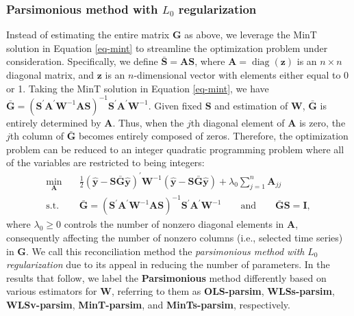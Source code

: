 \documentclass[
  11pt]{article}
\theoremstyle{plain}
\theoremstyle{remark}
\begin{document}
\subsubsection*{\texorpdfstring{Parsimonious method with \(L_0\)
regularization}{Parsimonious method with L\_0 regularization}}\label{parsimonious-method-with-l_0-regularization}

Instead of estimating the entire matrix \(\bm{G}\) as above, we leverage
the MinT solution in Equation \eqref{eq-mint} to streamline the
optimization problem under consideration. Specifically, we define
\(\bar{\bm{S}} = \bm{A}\bm{S}\), where
\(\bm{A} = \operatorname{diag}(\bm{z})\) is an \(n \times n\) diagonal
matrix, and \(\bm{z}\) is an \(n\)-dimensional vector with elements
either equal to 0 or 1. Taking the MinT solution in Equation
\eqref{eq-mint}, we have
\(\bar{\bm{G}} = (\bm{S}^{\prime}\bm{A}^{\prime}\bm{W}^{-1}\bm{A}\bm{S})^{-1}\bm{S}^{\prime}\bm{A}^{\prime}\bm{W}^{-1}\).
Given fixed \(\bm{S}\) and estimation of \(\bm{W}\), \(\bar{\bm{G}}\) is
entirely determined by \(\bm{A}\). Thus, when the \(j\)th diagonal
element of \(\bm{A}\) is zero, the \(j\)th column of \(\bar{\bm{G}}\)
becomes entirely composed of zeros. Therefore, the optimization problem
can be reduced to an integer quadratic programming problem where all of
the variables are restricted to being integers: \begin{align*}
\min_{\bm{A}} \quad & \frac{1}{2}\left(\hat{\bm{y}}-\bm{S}\bar{\bm{G}}\hat{\bm{y}}\right)^{\prime} \bm{W}^{-1}\left(\hat{\bm{y}}-\bm{S}\bar{\bm{G}}\hat{\bm{y}}\right) + \lambda_0 \sum_{j=1}^n \bm{A}_{jj} \\
\text{s.t.} \quad & \bar{\bm{G}} = (\bm{S}^{\prime}\bm{A}^{\prime}\bm{W}^{-1}\bm{A}\bm{S})^{-1}\bm{S}^{\prime}\bm{A}^{\prime}\bm{W}^{-1} \qquad\text{and}\qquad \bar{\bm{G}}\bm{S} = \bm{I},
\end{align*} where \(\lambda_0 \geq 0\) controls the number of nonzero
diagonal elements in \(\bm{A}\), consequently affecting the number of
nonzero columns (i.e., selected time series) in \(\bm{G}\). We call this
reconciliation method the \emph{parsimonious method with} \(L_0\)
\emph{regularization} due to its appeal in reducing the number of
parameters. In the results that follow, we label the
\textbf{Parsimonious} method differently based on various estimators for
\(\bm{W}\), referring to them as \textbf{OLS-parsim},
\textbf{WLSs-parsim}, \textbf{WLSv-parsim}, \textbf{MinT-parsim}, and
\textbf{MinTs-parsim}, respectively.
\end{document}
